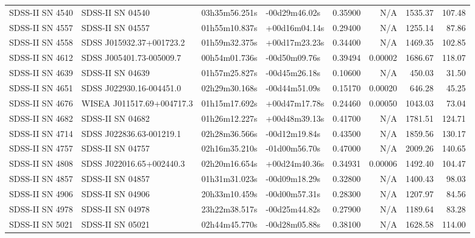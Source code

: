 \begin{longtable}{llllrrrr}
SDSS-II SN 4540  &                SDSS-II SN 04540 &   03h35m56.251s &   -00d29m46.02s &  0.35900 &      N/A &  1535.37 &      107.48 \\
SDSS-II SN 4557  &                SDSS-II SN 04557 &   01h55m10.837s &   +00d16m04.14s &  0.29400 &      N/A &  1255.14 &       87.86 \\
SDSS-II SN 4558  &        SDSS J015932.37+001723.2 &   01h59m32.375s &   +00d17m23.23s &  0.34400 &      N/A &  1469.35 &      102.85 \\
SDSS-II SN 4612  &        SDSS J005401.73-005009.7 &   00h54m01.736s &   -00d50m09.76s &  0.39494 &  0.00002 &  1686.67 &      118.07 \\
SDSS-II SN 4639  &                SDSS-II SN 04639 &   01h57m25.827s &   -00d45m26.18s &  0.10600 &      N/A &   450.03 &       31.50 \\
SDSS-II SN 4651  &        SDSS J022930.16-004451.0 &   02h29m30.168s &   -00d44m51.09s &  0.15170 &  0.00020 &   646.28 &       45.25 \\
SDSS-II SN 4676  &       WISEA J011517.69+004717.3 &   01h15m17.692s &   +00d47m17.78s &  0.24460 &  0.00050 &  1043.03 &       73.04 \\
SDSS-II SN 4682  &                SDSS-II SN 04682 &   01h26m12.227s &   +00d48m39.13s &  0.41700 &      N/A &  1781.51 &      124.71 \\
SDSS-II SN 4714  &        SDSS J022836.63-001219.1 &   02h28m36.566s &   -00d12m19.84s &  0.43500 &      N/A &  1859.56 &      130.17 \\
SDSS-II SN 4757  &                SDSS-II SN 04757 &   02h16m35.210s &   -01d00m56.70s &  0.47000 &      N/A &  2009.26 &      140.65 \\
SDSS-II SN 4808  &        SDSS J022016.65+002440.3 &   02h20m16.654s &   +00d24m40.36s &  0.34931 &  0.00006 &  1492.40 &      104.47 \\
SDSS-II SN 4857  &                SDSS-II SN 04857 &   01h31m31.023s &   -00d09m18.29s &  0.32800 &      N/A &  1400.43 &       98.03 \\
SDSS-II SN 4906  &                SDSS-II SN 04906 &   20h33m10.459s &   -00d00m57.31s &  0.28300 &      N/A &  1207.97 &       84.56 \\
SDSS-II SN 4978  &                SDSS-II SN 04978 &   23h22m38.517s &   -00d25m44.82s &  0.27900 &      N/A &  1189.64 &       83.28 \\
SDSS-II SN 5021  &                SDSS-II SN 05021 &   02h44m45.770s &   -00d28m05.88s &  0.38100 &      N/A &  1628.58 &      114.00 \\

\end{longtable}
